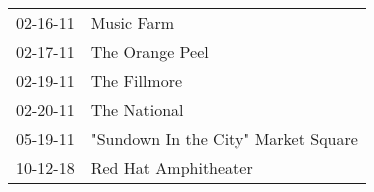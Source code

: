\begin{supertabular}{p{0.07\textwidth}p{0.23\textwidth}}
 02-16-11 &                           Music Farm \\
 02-17-11 &                      The Orange Peel \\
 02-19-11 &                         The Fillmore \\
 02-20-11 &                         The National \\
 05-19-11 &  "Sundown In the City" Market Square \\
 10-12-18 &                 Red Hat Amphitheater \\
\end{supertabular}
